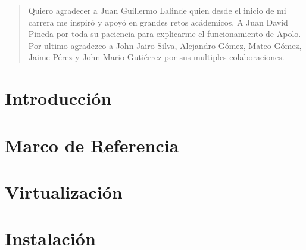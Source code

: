 \documentclass[twoside,letterpaper,12pt]{report}
\begin{document}
\renewcommand{\abstractname}{Agradecimientos}
\begin{abstract}

	Quiero agradecer a Juan Guillermo Lalinde quien desde el inicio de mi carrera me inspiró y apoyó en grandes retos acádemicos. A Juan David Pineda por toda su paciencia para explicarme el funcionamiento de Apolo. Por ultimo agradezco a John Jairo Silva, Alejandro Gómez, Mateo Gómez, Jaime Pérez y John Mario Gutiérrez por sus multiples colaboraciones. 	


\end{abstract}

\newpage

\chapter{Introducción}


\chapter{Marco de Referencia}\label{ChapRef}


\chapter{Virtualización}


\chapter{Instalación}

\end{document}
